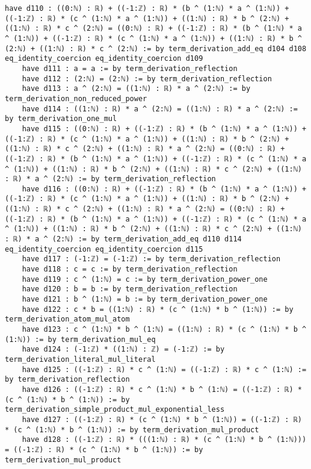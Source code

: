 \documentclass{article}
\begin{document}
\begin{tcolorbox}[colback=white!10, width=\linewidth]
\begin{lstlisting}[language=Lean4]
    have d110 : ((0:ℕ) : ℝ) + ((-1:ℤ) : ℝ) * (b ^ (1:ℕ) * a ^ (1:ℕ)) + ((-1:ℤ) : ℝ) * (c ^ (1:ℕ) * a ^ (1:ℕ)) + ((1:ℕ) : ℝ) * b ^ (2:ℕ) + ((1:ℕ) : ℝ) * c ^ (2:ℕ) = ((0:ℕ) : ℝ) + ((-1:ℤ) : ℝ) * (b ^ (1:ℕ) * a ^ (1:ℕ)) + ((-1:ℤ) : ℝ) * (c ^ (1:ℕ) * a ^ (1:ℕ)) + ((1:ℕ) : ℝ) * b ^ (2:ℕ) + ((1:ℕ) : ℝ) * c ^ (2:ℕ) := by term_derivation_add_eq d104 d108 eq_identity_coercion eq_identity_coercion d109
    have d111 : a = a := by term_derivation_reflection
    have d112 : (2:ℕ) = (2:ℕ) := by term_derivation_reflection
    have d113 : a ^ (2:ℕ) = ((1:ℕ) : ℝ) * a ^ (2:ℕ) := by term_derivation_non_reduced_power
    have d114 : ((1:ℕ) : ℝ) * a ^ (2:ℕ) = ((1:ℕ) : ℝ) * a ^ (2:ℕ) := by term_derivation_one_mul
    have d115 : ((0:ℕ) : ℝ) + ((-1:ℤ) : ℝ) * (b ^ (1:ℕ) * a ^ (1:ℕ)) + ((-1:ℤ) : ℝ) * (c ^ (1:ℕ) * a ^ (1:ℕ)) + ((1:ℕ) : ℝ) * b ^ (2:ℕ) + ((1:ℕ) : ℝ) * c ^ (2:ℕ) + ((1:ℕ) : ℝ) * a ^ (2:ℕ) = ((0:ℕ) : ℝ) + ((-1:ℤ) : ℝ) * (b ^ (1:ℕ) * a ^ (1:ℕ)) + ((-1:ℤ) : ℝ) * (c ^ (1:ℕ) * a ^ (1:ℕ)) + ((1:ℕ) : ℝ) * b ^ (2:ℕ) + ((1:ℕ) : ℝ) * c ^ (2:ℕ) + ((1:ℕ) : ℝ) * a ^ (2:ℕ) := by term_derivation_reflection
    have d116 : ((0:ℕ) : ℝ) + ((-1:ℤ) : ℝ) * (b ^ (1:ℕ) * a ^ (1:ℕ)) + ((-1:ℤ) : ℝ) * (c ^ (1:ℕ) * a ^ (1:ℕ)) + ((1:ℕ) : ℝ) * b ^ (2:ℕ) + ((1:ℕ) : ℝ) * c ^ (2:ℕ) + ((1:ℕ) : ℝ) * a ^ (2:ℕ) = ((0:ℕ) : ℝ) + ((-1:ℤ) : ℝ) * (b ^ (1:ℕ) * a ^ (1:ℕ)) + ((-1:ℤ) : ℝ) * (c ^ (1:ℕ) * a ^ (1:ℕ)) + ((1:ℕ) : ℝ) * b ^ (2:ℕ) + ((1:ℕ) : ℝ) * c ^ (2:ℕ) + ((1:ℕ) : ℝ) * a ^ (2:ℕ) := by term_derivation_add_eq d110 d114 eq_identity_coercion eq_identity_coercion d115
    have d117 : (-1:ℤ) = (-1:ℤ) := by term_derivation_reflection
    have d118 : c = c := by term_derivation_reflection
    have d119 : c ^ (1:ℕ) = c := by term_derivation_power_one
    have d120 : b = b := by term_derivation_reflection
    have d121 : b ^ (1:ℕ) = b := by term_derivation_power_one
    have d122 : c * b = ((1:ℕ) : ℝ) * (c ^ (1:ℕ) * b ^ (1:ℕ)) := by term_derivation_atom_mul_atom
    have d123 : c ^ (1:ℕ) * b ^ (1:ℕ) = ((1:ℕ) : ℝ) * (c ^ (1:ℕ) * b ^ (1:ℕ)) := by term_derivation_mul_eq
    have d124 : (-1:ℤ) * ((1:ℕ) : ℤ) = (-1:ℤ) := by term_derivation_literal_mul_literal
    have d125 : ((-1:ℤ) : ℝ) * c ^ (1:ℕ) = ((-1:ℤ) : ℝ) * c ^ (1:ℕ) := by term_derivation_reflection
    have d126 : ((-1:ℤ) : ℝ) * c ^ (1:ℕ) * b ^ (1:ℕ) = ((-1:ℤ) : ℝ) * (c ^ (1:ℕ) * b ^ (1:ℕ)) := by term_derivation_simple_product_mul_exponential_less
    have d127 : ((-1:ℤ) : ℝ) * (c ^ (1:ℕ) * b ^ (1:ℕ)) = ((-1:ℤ) : ℝ) * (c ^ (1:ℕ) * b ^ (1:ℕ)) := by term_derivation_mul_product
    have d128 : ((-1:ℤ) : ℝ) * (((1:ℕ) : ℝ) * (c ^ (1:ℕ) * b ^ (1:ℕ))) = ((-1:ℤ) : ℝ) * (c ^ (1:ℕ) * b ^ (1:ℕ)) := by term_derivation_mul_product

\end{lstlisting}
\end{tcolorbox}
\end{document}
